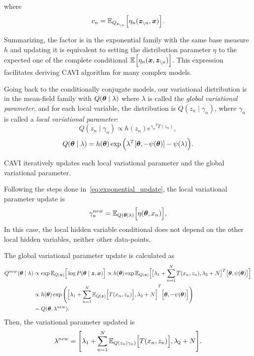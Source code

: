 where
\[
  v_{n} = \mathbb{E}_{Q_{\bm{z}_{\backslash n}}}\Big[\eta_{n}(\bm{z}_{\backslash n}, \bm{x})\Big].
\]

Summarizing, the factor is in the exponential family with the same base measure \(h\) and updating it is equivalent to setting the distribution parameter \(\eta\) to the expected one of the complete conditional \(\mathbb{E}_{}\Big[\eta_{n}(\bm{x}, \bm{z}_{\backslash n})\Big]\). This expression facilitates deriving CAVI algorithm for many complex models.

Going back to the conditionally conjugate models, our variational distribution is in the mean-field family with \(Q(\bm{\theta} \mid \lambda)\) where \(\lambda\) is called the \emph{global variational parameter}, and for each local variable, the distribution is \(Q(z_{n} \mid \gamma_{n})\), where \(\gamma_{n}\) is called a \emph{local variational parameter}:
\[
  Q(z_{n} \mid \gamma_{n}) \propto h(z_{n})e^{{\gamma_{n}}^{T}T(z_{n})},
\]
\[
  Q(\bm{\theta} \mid \lambda) = h(\bm{\theta}) \exp \Big( {\lambda}^{T}[\bm{\theta}, -\psi(\bm{\theta})] - \psi(\lambda) \Big).
\]

CAVI iteratively updates each local variational parameter and the global variational parameter.

Following the steps done in~\ref{eq:exponential_update}, the local variational parameter update is
\[
  \gamma_{n}^{new} = \mathbb{E}_{Q(\bm{\theta} \mid \lambda)}\Big[\eta(\bm{\theta}, x_{n})\Big],
\]
In this case, the local hidden variable conditional does not depend on the other local hidden variables, neither other data-points.

The global variational parameter update is calculated as
\[
  \begin{aligned}
    Q^{new}(\bm{\theta} \mid \lambda) &\propto \exp \mathbb{E}_{Q(\bm{z})}\Big[\log P(\bm{\theta} \mid \bm{z} , \bm{x})\Big] \propto h(\bm{\theta}) \exp \mathbb{E}_{Q(\bm{z})}\Big[\big[  \lambda_{1} + \sum_{n=1}^{N}T(x_{n}, z_{n}), \lambda_{2} + N \big]^{T}\big[ \bm{\theta}, \psi(\bm{\theta}) \big]\Big]\\
    &\propto h(\bm{\theta}) \exp \Bigg( {\Big[  \lambda_{1} + \sum_{n=1}^{N}\mathbb{E}_{Q(\bm{z})}\Big[T(x_{n}, z_{n})\Big], \lambda_{2} + N \Big]}^{T}\Big[ \bm{\theta}, - \psi(\bm{\theta}) \Big]\Bigg)\\
    &= Q(\bm{\theta}, \lambda^{new}).
  \end{aligned}
\]
Then, the variational parameter updated is
\[
  \lambda^{new} = \Bigg[ \lambda_{1} + \sum_{n=1}^{N} \mathbb{E}_{Q(z_{n}\mid \gamma_{n})}\Big[T(x_{n},z_{n})\Big], \lambda_{2} + N \Bigg].
\]

